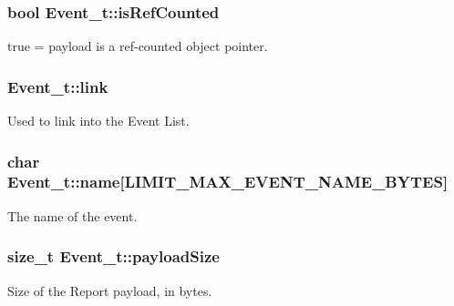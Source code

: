 \subsubsection[{\texorpdfstring{is\+Ref\+Counted}{isRefCounted}}]{\setlength{\rightskip}{0pt plus 5cm}bool Event\+\_\+t\+::is\+Ref\+Counted}\hypertarget{struct_event__t_a029e6394a86ac5455f349a5b8de372e3}{}\label{struct_event__t_a029e6394a86ac5455f349a5b8de372e3}


true = payload is a ref-\/counted object pointer. 

\subsubsection[{\texorpdfstring{link}{link}}]{ Event\+\_\+t\+::link}\hypertarget{struct_event__t_a71c82639758c9b263ffd9a6838f16240}{}\label{struct_event__t_a71c82639758c9b263ffd9a6838f16240}


Used to link into the Event List. 

\subsubsection[{\texorpdfstring{name}{name}}]{\setlength{\rightskip}{0pt plus 5cm}char Event\+\_\+t\+::name\mbox{[}{\bf L\+I\+M\+I\+T\+\_\+\+M\+A\+X\+\_\+\+E\+V\+E\+N\+T\+\_\+\+N\+A\+M\+E\+\_\+\+B\+Y\+T\+ES}\mbox{]}}\hypertarget{struct_event__t_a39459865b6f387597cc189420ba47f4f}{}\label{struct_event__t_a39459865b6f387597cc189420ba47f4f}


The name of the event. 

\subsubsection[{\texorpdfstring{payload\+Size}{payloadSize}}]{\setlength{\rightskip}{0pt plus 5cm}size\+\_\+t Event\+\_\+t\+::payload\+Size}\hypertarget{struct_event__t_ac9e4c1fed8cd5750033933274b27124d}{}\label{struct_event__t_ac9e4c1fed8cd5750033933274b27124d}


Size of the Report payload, in bytes. 


